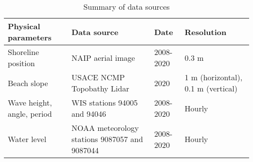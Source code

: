 \begin{table}[htbp]
\centering
\caption{Summary of data sources}
\label{Summary of data sources}
\begin{tabular}{|p{3cm}|p{4cm}|p{4cm}|p{4cm}|}
\hline
\textbf{Physical parameters} & \textbf{Data source} & \textbf{Date} & \textbf{Resolution} \\ \hline
Shoreline position & NAIP aerial image & 2008-2020 & 0.3 m \\ \hline
Beach slope & USACE NCMP Topobathy Lidar & 2020 & 1 m (horizontal), 0.1 m (vertical) \\ \hline
Wave height, angle, period & WIS stations 94005 and 94046 & 2008-2020 & Hourly \\ \hline
Water level & NOAA meteorology stations 9087057 and 9087044 & 2008-2020 & Hourly \\ \hline
\end{tabular}
\end{table}
